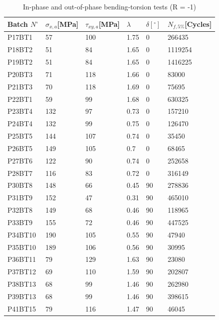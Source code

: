 \begin{table}[]
\centering
\begin{tabular}{|l|l|l|l|l|l|}
\hline
Batch $N^\circ$ & $\sigma_{x,a}${[}MPa{]} & $\tau_{xy,a}${[}MPa{]} & $\lambda$ & $\delta [^\circ]$ & $N_{f,5\%}${[}Cycles{]} \\ \hline
P17BT1 & 57 & 100 & 1.75 & 0 & 266435 \\ \hline
P18BT2 & 51 & 84 & 1.65 & 0 & 1119254 \\ \hline
P19BT2 & 51 & 84 & 1.65 & 0 & 1416225 \\ \hline
P20BT3 & 71 & 118 & 1.66 & 0 & 83000 \\ \hline
P21BT3 & 70 & 118 & 1.69 & 0 & 75695 \\ \hline
P22BT1 & 59 & 99 & 1.68 & 0 & 630325 \\ \hline
P23BT4 & 132 & 97 & 0.73 & 0 & 157210 \\ \hline
P24BT4 & 132 & 99 & 0.75 & 0 & 126470 \\ \hline
P25BT5 & 144 & 107 & 0.74 & 0 & 35450 \\ \hline
P26BT5 & 149 & 105 & 0.7 & 0 & 68465 \\ \hline
P27BT6 & 122 & 90 & 0.74 & 0 & 252658 \\ \hline
P28BT7 & 116 & 83 & 0.72 & 0 & 316149 \\ \hline
P30BT8 & 148 & 66 & 0.45 & 90 & 278836 \\ \hline
P31BT9 & 152 & 47 & 0.31 & 90 & 465010 \\ \hline
P32BT8 & 149 & 68 & 0.46 & 90 & 118965 \\ \hline
P33BT9 & 155 & 72 & 0.46 & 90 & 447525 \\ \hline
P34BT10 & 190 & 105 & 0.55 & 90 & 47940 \\ \hline
P35BT10 & 189 & 106 & 0.56 & 90 & 30995 \\ \hline
P36BT11 & 79 & 129 & 1.63 & 90 & 23080 \\ \hline
P37BT12 & 69 & 110 & 1.59 & 90 & 202807 \\ \hline
P38BT13 & 68 & 99 & 1.46 & 90 & 262980 \\ \hline
P39BT13 & 68 & 99 & 1.46 & 90 & 398615 \\ \hline
P41BT15 & 79 & 116 & 1.47 & 90 & 46045 \\ \hline
\end{tabular}
\caption{In-phase and out-of-phase bending-torsion tests (R = -1)\cite{susmel2003multiaxial}}
\label{tab.AL6082T6BT2D}
\end{table}


